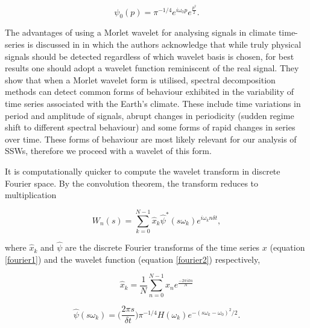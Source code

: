 \begin{equation} \label{psi0}
\psi_0(p) = \pi^{-1/4} e^{i\omega_0 p} e^{\frac{p^2}{2}}.
\end{equation}

The advantages of using a Morlet wavelet for analysing signals in climate time-series is discussed in \cite{Lau1995} in which the authors acknowledge that while truly physical signals should be detected regardless of which wavelet basis is chosen, for best results one should adopt a wavelet function reminiscent of the real signal. They show that when a Morlet wavelet form is utilised, spectral decomposition methods can detect common forms of behaviour exhibited in the variability of time series associated with the Earth's climate. These include time variations in period and amplitude of signals, abrupt changes in periodicity (sudden regime shift to different spectral behaviour) and some forms of rapid changes in series over time. These forms of behaviour are most likely relevant for our analysis of SSWs, therefore we proceed with a wavelet of this form. 

It is computationally quicker to compute the wavelet transform in discrete Fourier space. By the convolution theorem, the transform reduces to multiplication

\begin{equation} \label{wavelet_transform2}
W_n(s) = \sum^{N - 1}_{k = 0} \hat{x}_{k} \hat{\psi}^* (s\omega_k) e^{i \omega_k n \delta t},
\end{equation}

where $\hat{x}_{k}$ and $\hat{\psi}$ are the discrete Fourier transforms of the time series $x$ (equation \ref{fourier1}) and the wavelet function (equation \ref{fourier2}) respectively,

\begin{equation} \label{fourier1}
\hat{x}_k = \frac{1}{N} \sum^{N-1}_{n = 0} x_n e^{\frac{-2\pi i k n}{N}}
\end{equation}

\begin{equation} \label{fourier2}
\hat{\psi}(s\omega_k) = \bigg(\frac{2 \pi s}{\delta t}\bigg) \pi^{-1/4}H(\omega_k) e^{-(s\omega_k - \omega_0)^2/2}.
\end{equation}

